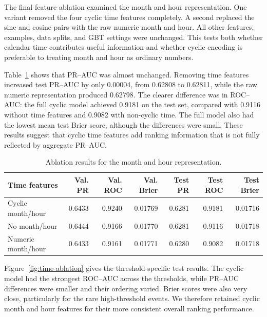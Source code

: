 \documentclass[11pt]{article}
\begin{document}
The final feature ablation examined the month and hour representation. One
variant removed the four cyclic time features completely. A second replaced
the sine and cosine pairs with the raw numeric month and hour. All other
features, examples, data splits, and GBT settings were unchanged. This tests
both whether calendar time contributes useful information and whether cyclic
encoding is preferable to treating month and hour as ordinary numbers.

Table~\ref{tab:time-ablation} shows that PR--AUC was almost unchanged. Removing
time features increased test PR--AUC by only 0.00004, from 0.62808 to 0.62811,
while the raw numeric representation produced 0.62798. The clearer difference
was in ROC--AUC: the full cyclic model achieved 0.9181 on the test set,
compared with 0.9116 without time features and 0.9082 with non-cyclic time.
The full model also had the lowest mean test Brier score, although the
differences were small. These results suggest that cyclic time features add
ranking information that is not fully reflected by aggregate PR--AUC.

\begin{table}[htbp]
    \centering
    \caption{Ablation results for the month and hour representation.}
    \label{tab:time-ablation}
    \small
    \begin{tabular}{@{}lrrrrrr@{}}
        \toprule
        Time features & Val. PR & Val. ROC & Val. Brier
                      & Test PR & Test ROC & Test Brier \\
        \midrule
        Cyclic month/hour & 0.6433 & 0.9240 & 0.01769
                          & 0.6281 & 0.9181 & 0.01716 \\
        No month/hour     & 0.6444 & 0.9166 & 0.01770
                          & 0.6281 & 0.9116 & 0.01718 \\
        Numeric month/hour & 0.6433 & 0.9161 & 0.01771
                           & 0.6280 & 0.9082 & 0.01718 \\
        \bottomrule
    \end{tabular}
\end{table}

Figure~\ref{fig:time-ablation} gives the threshold-specific test results. The
cyclic model had the strongest ROC--AUC across the thresholds, while PR--AUC
differences were smaller and their ordering varied. Brier scores were also
very close, particularly for the rare high-threshold events. We therefore
retained cyclic month and hour features for their more consistent overall
ranking performance.
\end{document}
